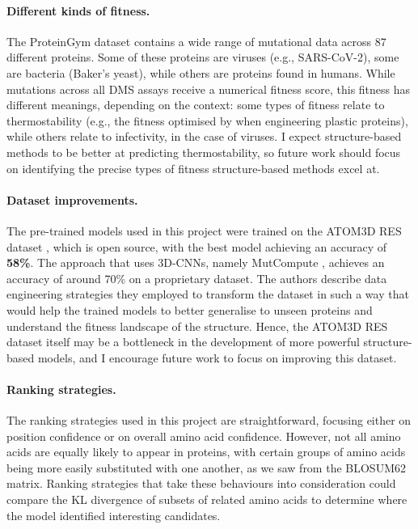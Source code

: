 \paragraph{Different kinds of fitness.} The ProteinGym dataset \cite{tranception} contains a wide range of mutational data across 87 different proteins. Some of these proteins are viruses (e.g., SARS-CoV-2), some are bacteria (Baker's yeast), while others are proteins found in humans. While mutations across all DMS assays receive a numerical fitness score, this fitness has different meanings, depending on the context: some types of fitness relate to thermostability (e.g., the fitness optimised by \citet{Lu2022} when engineering plastic proteins), while others relate to infectivity, in the case of viruses. I expect structure-based methods to be better at predicting thermostability, so future work should focus on identifying the precise types of fitness structure-based methods excel at. 

\paragraph{Dataset improvements.} The pre-trained models used in this project were trained on the ATOM3D RES dataset \cite{atom-3d}, which is open source, with the best model achieving an accuracy of \textbf{58\%}. The approach that uses 3D-CNNs, namely MutCompute \cite{mutcompute}, achieves an accuracy of around 70\% on a proprietary dataset. The authors describe data engineering strategies they employed to transform the dataset in such a way that would help the trained models to better generalise to unseen proteins and understand the fitness landscape of the structure. Hence, the ATOM3D RES dataset itself  may be a bottleneck in the development of more powerful structure-based models, and I encourage future work to focus on improving this dataset. 

\paragraph{Ranking strategies.} The ranking strategies used in this project are straightforward, focusing either on position confidence or on overall amino acid confidence. However, not all amino acids are equally likely to appear in proteins, with certain groups of amino acids being more easily substituted with one another, as we saw from the BLOSUM62 matrix. Ranking strategies that take these behaviours into consideration could compare the KL divergence of subsets of related amino acids to determine where the model identified interesting candidates.

